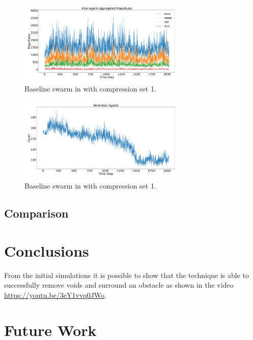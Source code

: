 \documentclass[12pt,a4paper]{IEEEtran}
\begin{document}
\begin{figure}[H]
	\begin{center}
		\includegraphics[width=8cm]{figures/baselineSwarmMagnitude1}
	\end{center}
	\caption{Baseline swarm in with compression set 1. \label{fig:baselineSwarmMagnitude1}}
\end{figure}

\begin{figure}[H]
	\begin{center}
		\includegraphics[width=8cm]{figures/baselineSwarmPerimeter1}
	\end{center}
	\caption{Baseline swarm in with compression set 1. \label{fig:baselineSwarmPerimeter1}}
\end{figure}

\subsection{Comparison}

\section{Conclusions}\label{conclusions}
From the initial simulations it is possible to show that the technique is able to successfully remove voids and surround an obstacle as shown in the video \href{https://youtu.be/3eY1vvq0JWo}{https://youtu.be/3eY1vvq0JWo}.

\section{Future Work}



\end{document}
